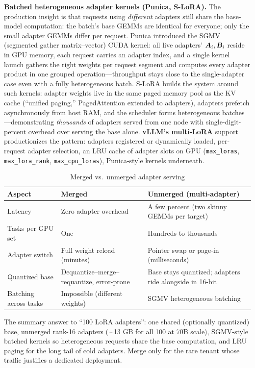 \textbf{Batched heterogeneous adapter kernels (Punica, S-LoRA).} The production insight is that requests using \emph{different} adapters still share the base-model computation: the batch's base GEMMs are identical for everyone; only the small adapter GEMMs differ per request. Punica introduced the SGMV (segmented gather matrix--vector) CUDA kernel: all live adapters' $\bm{A}_i, \bm{B}_i$ reside in GPU memory, each request carries an adapter index, and a single kernel launch gathers the right weights per request segment and computes every adapter product in one grouped operation---throughput stays close to the single-adapter case even with a fully heterogeneous batch. S-LoRA builds the system around such kernels: adapter weights live in the same paged memory pool as the KV cache (``unified paging,'' PagedAttention extended to adapters), adapters prefetch asynchronously from host RAM, and the scheduler forms heterogeneous batches---demonstrating \emph{thousands} of adapters served from one node with single-digit-percent overhead over serving the base alone. \textbf{vLLM's multi-LoRA} support productionizes the pattern: adapters registered or dynamically loaded, per-request adapter selection, an LRU cache of adapter slots on GPU (\texttt{max\_loras}, \texttt{max\_lora\_rank}, \texttt{max\_cpu\_loras}), Punica-style kernels underneath.

\begin{table}[H]
\centering
\caption{Merged vs.\ unmerged adapter serving}
\begin{tabularx}{\textwidth}{lXX}
\toprule
\textbf{Aspect} & \textbf{Merged} & \textbf{Unmerged (multi-adapter)} \\
\midrule
Latency & Zero adapter overhead & A few percent (two skinny GEMMs per target) \\
Tasks per GPU set & One & Hundreds to thousands \\
Adapter switch & Full weight reload (minutes) & Pointer swap or page-in (milliseconds) \\
Quantized base & Dequantize--merge--requantize, error-prone & Base stays quantized; adapters ride alongside in 16-bit \\
Batching across tasks & Impossible (different weights) & SGMV heterogeneous batching \\
\bottomrule
\end{tabularx}
\end{table}

The summary answer to ``100 LoRA adapters'': one shared (optionally quantized) base, unmerged rank-16 adapters ($\sim$13 GB for all 100 at 70B scale), SGMV-style batched kernels so heterogeneous requests share the base computation, and LRU paging for the long tail of cold adapters. Merge only for the rare tenant whose traffic justifies a dedicated deployment.

